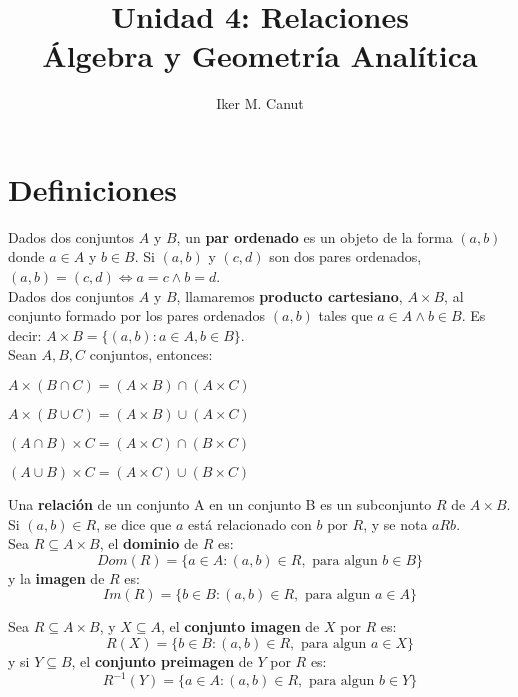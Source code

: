 \documentclass[11pt,a4paper]{article}
\author{Iker M. Canut}
\title{Unidad 4: Relaciones\\\'Algebra y Geometr\'ia Anal\'itica}
\begin{document}
\maketitle
\newpage

\section{Definiciones}
Dados dos conjuntos $A$ y $B$, un \textbf{par ordenado} es un objeto de la forma $(a,b)$ donde $a \in A$ y $b \in B$. Si $(a,b)$ y $(c,d)$ son dos pares ordenados, $(a,b) = (c,d) \iff a=c \land b=d$.\\

Dados dos conjuntos $A$ y $B$, llamaremos \textbf{producto cartesiano}, $A\times B$, al conjunto formado por los pares ordenados $(a,b)$ tales que $a\in A \land b\in B$. Es decir: $A\times B = \{(a,b):a\in A, b\in B\}$.\\

Sean $A,B, C$ conjuntos, entonces:
\begin{itemize}
\begin{multicols}{2}
\item $A \times (B \cap C) = (A \times B) \cap (A \times C)$
\item $A \times (B \cup C) = (A \times B) \cup (A \times C)$
\item $(A \cap B) \times C = (A \times C) \cap (B \times C)$
\item $(A \cup B) \times C = (A \times C) \cup (B \times C)$
\end{multicols}
\end{itemize}

\noindent \dotfill

Una \textbf{relaci\'on} de un conjunto A en un conjunto B es un subconjunto $R$ de $A \times B$. Si $(a,b) \in R$, se dice que $a$ est\'a relacionado con $b$ por $R$, y se nota $aRb$.\\

Sea $R \subseteq A \times B$, el \textbf{dominio} de $R$ es:
$$Dom(R) = \{ a \in A:(a,b) \in R, \text{ para algun } b\in B \}$$
\indent y la \textbf{imagen} de $R$ es:
$$Im(R) = \{ b\in B : (a,b)\in R, \text{ para algun } a \in A \}$$
\noindent \dotfill

Sea $R \subseteq A \times B$, y $X \subseteq A$, el \textbf{conjunto imagen} de $X$ por $R$ es:
$$R(X) = \{ b\in B : (a,b) \in R, \text{ para algun } a \in X \}$$
\indent y si $Y \subseteq B$, el \textbf{conjunto preimagen} de $Y$ por $R$ es:
$$R^{-1}(Y) = \{ a\in A : (a,b) \in R, \text{ para algun } b \in Y \}$$
\end{document}
